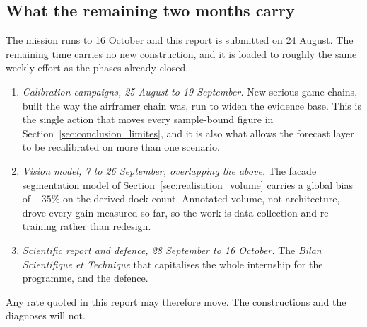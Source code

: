 \subsection*{What the remaining two months carry}

The mission runs to 16 October and this report is submitted on 24 August. The remaining time
carries no new construction, and it is loaded to roughly the same weekly effort as the phases
already closed.

\begin{enumerate}
    \item \emph{Calibration campaigns, 25 August to 19 September.} New serious-game chains,
    built the way the airframer chain was, run to widen the evidence base. This is the single
    action that moves every sample-bound figure in Section~\ref{sec:conclusion_limites}, and
    it is also what allows the forecast layer to be recalibrated on more than one scenario.
    \item \emph{Vision model, 7 to 26 September, overlapping the above.} The facade
    segmentation model of Section~\ref{sec:realisation_volume} carries a global bias of
    $-35\%$ on the derived dock count. Annotated volume, not architecture, drove every gain
    measured so far, so the work is data collection and re-training rather than redesign.
    \item \emph{Scientific report and defence, 28 September to 16 October.} The
    \emph{Bilan Scientifique et Technique} that capitalises the whole internship for the
    programme, and the defence.
\end{enumerate}

Any rate quoted in this report may therefore move. The constructions and the diagnoses will
not.
